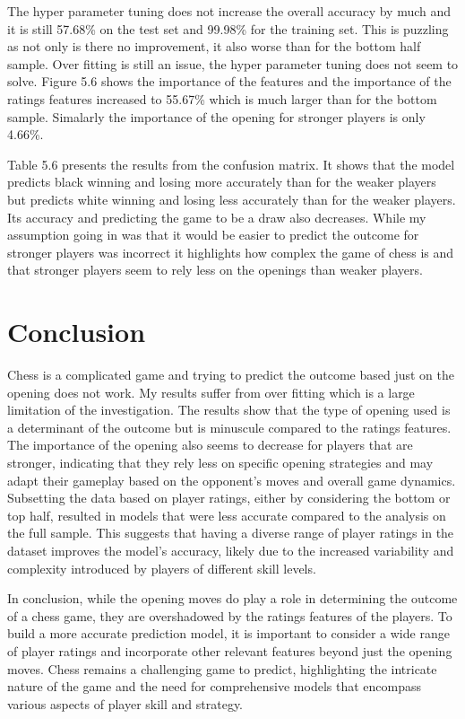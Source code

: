 \documentclass[12pt,preprint, authoryear]{elsarticle}
\numberwithin{equation}{section}
\numberwithin{figure}{section}
\numberwithin{table}{section}
\begin{document}
The hyper parameter tuning does not increase the overall accuracy by
much and it is still 57.68\% on the test set and 99.98\% for the
training set. This is puzzling as not only is there no improvement, it
also worse than for the bottom half sample. Over fitting is still an
issue, the hyper parameter tuning does not seem to solve. Figure 5.6
shows the importance of the features and the importance of the ratings
features increased to 55.67\% which is much larger than for the bottom
sample. Simalarly the importance of the opening for stronger players is
only 4.66\%.

Table 5.6 presents the results from the confusion matrix. It shows that
the model predicts black winning and losing more accurately than for the
weaker players but predicts white winning and losing less accurately
than for the weaker players. Its accuracy and predicting the game to be
a draw also decreases. While my assumption going in was that it would be
easier to predict the outcome for stronger players was incorrect it
highlights how complex the game of chess is and that stronger players
seem to rely less on the openings than weaker players.

\hypertarget{conclusion}{%
\section{Conclusion}\label{conclusion}}

Chess is a complicated game and trying to predict the outcome based just
on the opening does not work. My results suffer from over fitting which
is a large limitation of the investigation. The results show that the
type of opening used is a determinant of the outcome but is minuscule
compared to the ratings features. The importance of the opening also
seems to decrease for players that are stronger, indicating that they
rely less on specific opening strategies and may adapt their gameplay
based on the opponent's moves and overall game dynamics. Subsetting the
data based on player ratings, either by considering the bottom or top
half, resulted in models that were less accurate compared to the
analysis on the full sample. This suggests that having a diverse range
of player ratings in the dataset improves the model's accuracy, likely
due to the increased variability and complexity introduced by players of
different skill levels.

In conclusion, while the opening moves do play a role in determining the
outcome of a chess game, they are overshadowed by the ratings features
of the players. To build a more accurate prediction model, it is
important to consider a wide range of player ratings and incorporate
other relevant features beyond just the opening moves. Chess remains a
challenging game to predict, highlighting the intricate nature of the
game and the need for comprehensive models that encompass various
aspects of player skill and strategy.
\end{document}
